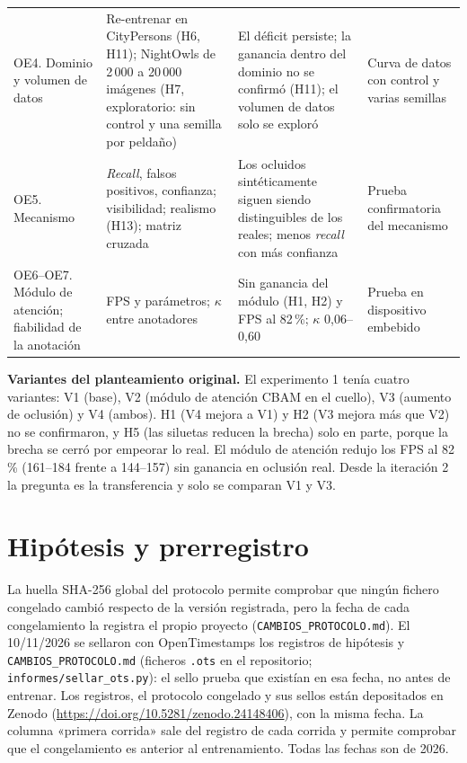 \documentclass[10pt]{article}
\begin{document}
\begin{table}[H]
\begin{tabular}{@{}p{3.3cm}p{4.6cm}p{5.4cm}p{2.6cm}@{}}
OE4. Dominio y volumen de datos & Re-entrenar en CityPersons (H6, H11); NightOwls de 2\,000 a 20\,000 imágenes (H7, exploratorio: sin control y una semilla por peldaño) & El déficit persiste; la ganancia dentro del dominio no se confirmó (H11); el volumen de datos solo se exploró & Curva de datos con control y varias semillas \\
OE5. Mecanismo & \emph{Recall}, falsos positivos, confianza; visibilidad; realismo (H13); matriz cruzada & Los ocluidos sintéticamente siguen siendo distinguibles de los reales; menos \emph{recall} con más confianza & Prueba confirmatoria del mecanismo \\
OE6--OE7. Módulo de atención; fiabilidad de la anotación & FPS y parámetros; $\kappa$ entre anotadores & Sin ganancia del módulo (H1, H2) y FPS al 82\,\%; $\kappa$ 0,06--0,60 & Prueba en dispositivo embebido \\
\bottomrule\end{tabular}\end{table}

\noindent\textbf{Variantes del planteamiento original.} El experimento 1 tenía cuatro variantes: V1 (base), V2 (módulo de atención CBAM en el cuello), V3 (aumento de oclusión) y V4 (ambos). H1 (V4 mejora a V1) y H2 (V3 mejora más que V2) no se confirmaron, y H5 (las siluetas reducen la brecha) solo en parte, porque la brecha se cerró por empeorar lo real. El módulo de atención redujo los FPS al 82\,\% (161--184 frente a 144--157) sin ganancia en oclusión real. Desde la iteración 2 la pregunta es la transferencia y solo se comparan V1 y V3.

\section{Hipótesis y prerregistro}
La huella SHA-256 global del protocolo permite comprobar que ningún fichero congelado cambió respecto de la versión registrada, pero la fecha de cada congelamiento la registra el propio proyecto (\texttt{CAMBIOS\_PROTOCOLO.md}). El 10/11/2026 se sellaron con OpenTimestamps los registros de hipótesis y \texttt{CAMBIOS\_PROTOCOLO.md} (ficheros \texttt{.ots} en el repositorio; \texttt{informes/sellar\_ots.py}): el sello prueba que existían en esa fecha, no antes de entrenar. Los registros, el protocolo congelado y sus sellos están depositados en Zenodo (\url{https://doi.org/10.5281/zenodo.24148406}), con la misma fecha. La columna «primera corrida» sale del registro de cada corrida y permite comprobar que el congelamiento es anterior al entrenamiento. Todas las fechas son de 2026.
\end{document}
